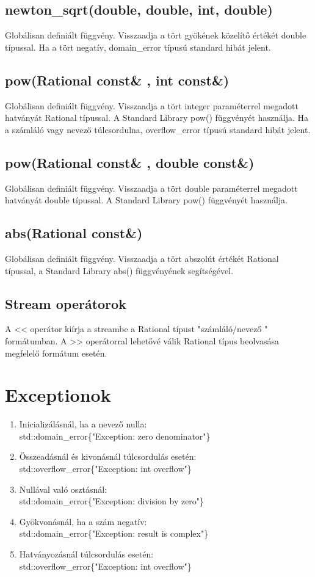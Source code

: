 \documentclass[a4paper, 12pt]{article}
\begin{document}
\subsection*{newton\_sqrt(double, double, int, double)}
Globálisan definiált függvény. Visszaadja a tört gyökének közelítő értékét double típussal. Ha a tört negatív, domain\_error típusú standard hibát jelent.

\subsection*{pow(Rational const\& , int const\&)}
Globálisan definiált függvény. Visszaadja a tört integer paraméterrel megadott hatványát Rational típussal. A Standard Library pow() függvényét használja. Ha a számláló vagy nevező túlcsordulna, overflow\_error típusú standard hibát jelent.

\subsection*{pow(Rational const\& , double const\&)}
Globálisan definiált függvény. Visszaadja a tört double paraméterrel megadott hatványát double típussal. A Standard Library pow() függvényét használja.

\subsection*{abs(Rational const\&)}
Globálisan definiált függvény. Visszaadja a tört abszolút értékét Rational típussal, a Standard Library abs() függvényének segítségével.

\subsection*{Stream operátorok}
A << operátor kiírja a streambe a Rational típust "számláló/nevező " formátumban. A >> operátorral lehetővé válik Rational típus beolvasása megfelelő formátum esetén.

\section{Exceptionok}
\begin{enumerate}
  \item Inicializálásnál, ha a nevező nulla: \\std::domain\_error\{"Exception: zero denominator"\}
  \item Összeadásnál és kivonásnál túlcsordulás esetén:\\ std::overflow\_error\{"Exception: int overflow"\}
  \item Nullával való osztásnál: \\std::domain\_error\{"Exception: division by zero"\}
  \item Gyökvonásnál, ha a szám negatív: \\std::domain\_error\{"Exception: result is complex"\}
  \item Hatványozásnál túlcsordulás esetén: \\std::overflow\_error\{"Exception: int overflow"\}
\end{enumerate}
\end{document}
